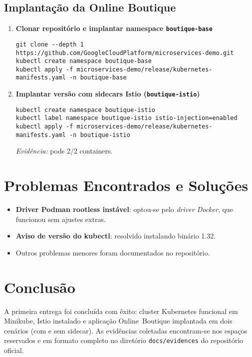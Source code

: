 \documentclass[12pt,a4paper]{report}
\begin{document}
\section{Implantação da Online Boutique}
\begin{enumerate}[label=\arabic*.]
\item\textbf{Clonar repositório e implantar namespace \texttt{boutique-base}}
\begin{verbatim}
git clone --depth 1 https://github.com/GoogleCloudPlatform/microservices-demo.git
kubectl create namespace boutique-base
kubectl apply -f microservices-demo/release/kubernetes-manifests.yaml -n boutique-base
\end{verbatim}
\item\textbf{Implantar versão com sidecars Istio (\texttt{boutique-istio})}
\begin{verbatim}
kubectl create namespace boutique-istio
kubectl label namespace boutique-istio istio-injection=enabled
kubectl apply -f microservices-demo/release/kubernetes-manifests.yaml -n boutique-istio
\end{verbatim}
\textit{Evidência:} pods 2/2 containers.\\
\vspace{2cm}
\end{enumerate}

\chapter{Problemas Encontrados e Soluções}
\begin{itemize}[leftmargin=*]
  \item \textbf{Driver Podman rootless instável}: optou‑se pelo \emph{driver Docker}, que funcionou sem ajustes extras.
  \item \textbf{Aviso de versão do kubectl}: resolvido instalando binário 1.32.
  \item Outros problemas menores foram documentados no repositório.
\end{itemize}

\chapter{Conclusão}
A primeira entrega foi concluída com êxito: cluster Kubernetes funcional em
Minikube, Istio instalado e aplicação Online Boutique implantada em dois
cenários (com e sem sidecar). As evidências coletadas encontram‑se nos espaços
reservados e em formato completo no diretório \texttt{docs/evidences} do
repositório oficial.
\end{document}
